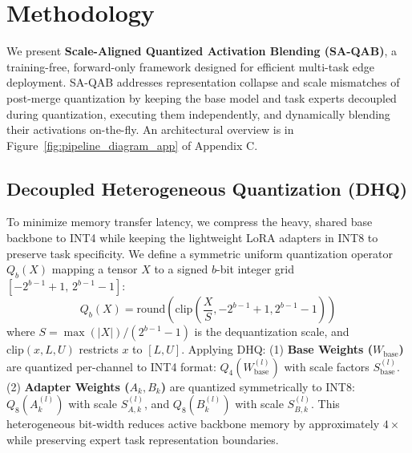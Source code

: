 \section{Methodology}
\label{sec:method}

We present \textbf{Scale-Aligned Quantized Activation Blending (SA-QAB)}, a training-free, forward-only framework designed for efficient multi-task edge deployment. SA-QAB addresses representation collapse and scale mismatches of post-merge quantization by keeping the base model and task experts decoupled during quantization, executing them independently, and dynamically blending their activations on-the-fly. An architectural overview is in Figure~\ref{fig:pipeline_diagram_app} of Appendix C.

\subsection{Decoupled Heterogeneous Quantization (DHQ)}
To minimize memory transfer latency, we compress the heavy, shared base backbone to INT4 while keeping the lightweight LoRA adapters \cite{lora} in INT8 to preserve task specificity. We define a symmetric uniform quantization operator $Q_b(X)$ mapping a tensor $X$ to a signed $b$-bit integer grid $[ -2^{b-1} + 1, \, 2^{b-1} - 1 ]$:
\begin{equation}
    Q_b(X) = \text{round}\left( \text{clip}\left(\frac{X}{S}, -2^{b-1} + 1, 2^{b-1} - 1\right) \right)
\end{equation}
where $S = \max(|X|) / (2^{b-1} - 1)$ is the dequantization scale, and $\text{clip}(x, L, U)$ restricts $x$ to $[L, U]$. 
Applying DHQ: (1) \textbf{Base Weights ($W_{\text{base}}$)} are quantized per-channel to INT4 format: $Q_4(W_{\text{base}}^{(l)})$ with scale factors $S_{\text{base}}^{(l)}$. (2) \textbf{Adapter Weights ($A_k, B_k$)} are quantized symmetrically to INT8: $Q_8(A_k^{(l)})$ with scale $S_{A, k}^{(l)}$, and $Q_8(B_k^{(l)})$ with scale $S_{B, k}^{(l)}$. This heterogeneous bit-width reduces active backbone memory by approximately $4\times$ while preserving expert task representation boundaries.

